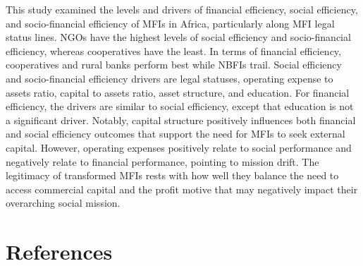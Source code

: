 \documentclass[
]{article}
\begin{document}
This study examined the levels and drivers of financial efficiency,
social efficiency, and socio-financial efficiency of MFIs in Africa,
particularly along MFI legal status lines. NGOs have the highest levels
of social efficiency and socio-financial efficiency, whereas
cooperatives have the least. In terms of financial efficiency,
cooperatives and rural banks perform best while NBFIs trail. Social
efficiency and socio-financial efficiency drivers are legal statuses,
operating expense to assets ratio, capital to assets ratio, asset
structure, and education. For financial efficiency, the drivers are
similar to social efficiency, except that education is not a significant
driver. Notably, capital structure positively influences both financial
and social efficiency outcomes that support the need for MFIs to seek
external capital. However, operating expenses positively relate to
social performance and negatively relate to financial performance,
pointing to mission drift. The legitimacy of transformed MFIs rests with
how well they balance the need to access commercial capital and the
profit motive that may negatively impact their overarching social
mission.

\hypertarget{references}{%
\section{References}\label{references}}
\end{document}
